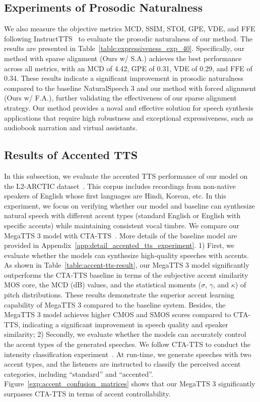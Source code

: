 \subsection{Experiments of Prosodic Naturalness}
\label{exp:prosodic_naturalness}
We also measure the objective metrics MCD, SSIM, STOI, GPE, VDE, and FFE following InstructTTS~\citep{yang2024instructtts} to evaluate the prosodic naturalness of our method. The results are presented in Table~\ref{table:expressiveness_exp_40}. Specifically, our method with sparse alignment (Ours w/ S.A.) achieves the best performance across all metrics, with an MCD of 4.42, GPE of 0.31, VDE of 0.29, and FFE of 0.34. These results indicate a significant improvement in prosodic naturalness compared to the baseline NaturalSpeech 3 and our method with forced alignment (Ours w/ F.A.), further validating the effectiveness of our sparse alignment strategy. Our method provides a noval and effective solution for speech synthesis applications that require high robustness and exceptional expressiveness, such as audiobook narration and virtual assistants.

\subsection{Results of Accented TTS}
In this subsection, we evaluate the accented TTS performance of our model on the L2-ARCTIC dataset~\citep{zhao2018l2arctic}. This corpus includes recordings from non-native speakers of English whose first languages are Hindi, Korean, etc. In this experiment, we focus on verifying whether our model and baseline can synthesize natural speech with different accent types (standard English or English with specific accents) while maintaining consistent vocal timbre. We compare our MegaTTS 3 model with CTA-TTS~\citep{liu2024controllable}. More details of the baseline model are provided in Appendix~\ref{app:detail_accented_tts_experiment}. 1) First, we evaluate whether the models can synthesize high-quality speeches with accents. As shown in Table~\ref{table:accent-tts-result}, our MegaTTS 3 model significantly outperforms the CTA-TTS baseline in terms of the subjective accent similarity MOS core, the MCD (dB) values, and the statistical moments ($\sigma$, $\gamma$, and $\kappa$) of pitch distributions. These results demonstrate the superior accent learning capability of MegaTTS 3 compared to the baseline system. Besides, the MegaTTS 3 model achieves higher CMOS and SMOS scores compared to CTA-TTS, indicating a significant improvement in speech quality and speaker similarity; 2) Secondly, we evaluate whether the models can accurately control the accent types of the generated speeches. We follow CTA-TTS to conduct the intensity classification experiment~\citep{liu2024controllable}. At
run-time, we generate speeches with two accent types, and the listeners are instructed to classify the perceived accent categories, including ``standard'' and ``accented''. Figure~\ref{exp:accent_confusion_matrices} shows that our MegaTTS 3 significantly surpasses CTA-TTS in terms of accent controllability.


